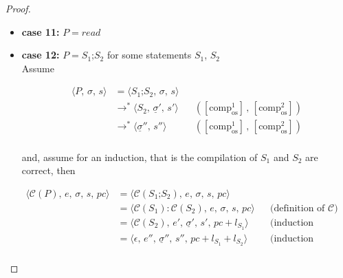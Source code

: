 \documentclass{article}
\begin{document}
\begin{proof}
\begin{itemize}
Similar to our proof of the correctness of \texttt{while}-statements, this assumes a finite depth of recursion (0, if there is no recursion) as we have assumed termination. \\


  \item \textbf{case 11:} $P = read$

  \item \textbf{case 12:} $P = S_1\texttt{;}S_2$ for some statements $S_1$, $S_2$\\

    Assume

    \[
      \begin{aligned}
      \langle P,\, \sigma,\, s \rangle
      &=\langle S_1\texttt{;}S_2,\, \sigma,\, s \rangle \\
      &\rightarrow^\ast \langle S_2,\, \underline{\sigma}' ,\, s' \rangle
      && ([\text{comp}^1_{\text{os}}] \,,\, [\text{comp}^2_{\text{os}}])   \\
      &\rightarrow^\ast \langle \underline{\sigma}'' ,\, s'' \rangle
      && ([\text{comp}^1_{\text{os}}] \,,\, [\text{comp}^2_{\text{os}}]) \\
      \end{aligned}
  \]
  
  and, assume for an induction, that is the compilation of $S_1$ and $S_2$ are correct, then

  \[
      \begin{aligned}
      \langle \mathcal{C}(P),\, e,\, \sigma,\, s,\, pc \rangle
      &= \langle \mathcal{C}(S_1\texttt{;}S_2),\, e,\, \sigma,\, s,\, pc \rangle \\
      &= \langle \mathcal{C}(S_1) : \mathcal{C}(S_2) ,\, e,\, \sigma,\, s,\, pc \rangle
      && \text{(definition of } \mathcal{C}\text{)} \\   
      &= \langle \mathcal{C}(S_2) ,\, e',\, \underline{\sigma}' ,\, s',\, pc + l_{S_1} \rangle
      && \text{(induction hypothesis 1)} \\   
      &= \langle \epsilon ,\, e'',\, \underline{\sigma}'' ,\, s'',\, pc + l_{S_1} + l_{S_2} \rangle
      && \text{(induction hypothesis 2)} \\ 
      \end{aligned}
  \]


\end{itemize}
\end{proof}
\end{document}
